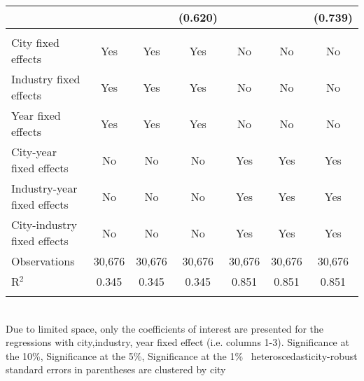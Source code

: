 \documentclass[12pt]{article}
\begin{document}
\begin{table}[!htbp]
\begin{adjustbox}{width=\textwidth, totalheight=\baselineskip,keepaspectratio}
\begin{tabular}{@{\extracolsep{5pt}}lcccccc}
  &  &  & (0.620) &  &  & (0.739) \\ 
 \hline \\[-1.8ex] 
City fixed effects & Yes & Yes & Yes & No & No & No \\ 
Industry fixed effects & Yes & Yes & Yes & No & No & No \\ 
Year fixed effects & Yes & Yes & Yes & No & No & No \\ 
City-year fixed effects & No & No & No & Yes & Yes & Yes \\ 
Industry-year fixed effects & No & No & No & Yes & Yes & Yes \\ 
City-industry fixed effects & No & No & No & Yes & Yes & Yes \\ 
Observations & 30,676 & 30,676 & 30,676 & 30,676 & 30,676 & 30,676 \\ 
R$^{2}$ & 0.345 & 0.345 & 0.345 & 0.851 & 0.851 & 0.851 \\ 
\hline 
\hline \\[-1.8ex] 
\end{tabular}
\end{adjustbox}
\begin{tablenotes} 
 \small 
 \item \\ 
\footnotesize{
Due to limited space, only the coefficients of interest are presented 
for the regressions with city,industry, year fixed effect (i.e. columns 1-3).
\sym{*} Significance at the 10\%, \sym{**} Significance at the 5\%, \sym{***} Significance at the 1\% \
heteroscedasticity-robust standard errors in parentheses are clustered by city 
}
 
\end{tablenotes}
\end{table}
\end{document}
